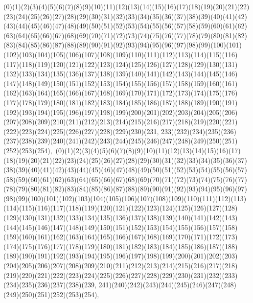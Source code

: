 \documentclass[12pt]{article}
\begin{document}
{(0)(1)(2)(3)(4)(5)(6)(7)(8)(9)(10)(11)(12)(13)(14)(15)(16)(17)(18)(19)(20)(21)(22)(23)(24)(25)(26)(27)(28)(29)(30)(31)(32)(33)(34)(35)(36)(37)(38)(39)(40)(41)(42)(43)(44)(45)(46)(47)(48)(49)(50)(51)(52)(53)(54)(55)(56)(57)(58)(59)(60)(61)(62)(63)(64)(65)(66)(67)(68)(69)(70)(71)(72)(73)(74)(75)(76)(77)(78)(79)(80)(81)(82)(83)(84)(85)(86)(87)(88)(89)(90)(91)(92)(93)(94)(95)(96)(97)(98)(99)(100)(101)(102)(103)(104)(105)(106)(107)(108)(109)(110)(111)(112)(113)(114)(115)(116)(117)(118)(119)(120)(121)(122)(123)(124)(125)(126)(127)(128)(129)(130)(131)(132)(133)(134)(135)(136)(137)(138)(139)(140)(141)(142)(143)(144)(145)(146)(147)(148)(149)(150)(151)(152)(153)(154)(155)(156)(157)(158)(159)(160)(161)(162)(163)(164)(165)(166)(167)(168)(169)(170)(171)(172)(173)(174)(175)(176)(177)(178)(179)(180)(181)(182)(183)(184)(185)(186)(187)(188)(189)(190)(191)(192)(193)(194)(195)(196)(197)(198)(199)(200)(201)(202)(203)(204)(205)(206)(207)(208)(209)(210)(211)(212)(213)(214)(215)(216)(217)(218)(219)(220)(221)(222)(223)(224)(225)(226)(227)(228)(229)(230)(231, 233)(232)(234)(235)(236)(237)(238)(239)(240)(241)(242)(243)(244)(245)(246)(247)(248)(249)(250)(251)(252)(253)(254)$
, 
$
(0)(1)(2)(3)(4)(5)(6)(7)(8)(9)(10)(11)(12)(13)(14)(15)(16)(17)(18)(19)(20)(21)(22)(23)(24)(25)(26)(27)(28)(29)(30)(31)(32)(33)(34)(35)(36)(37)(38)(39)(40)(41)(42)(43)(44)(45)(46)(47)(48)(49)(50)(51)(52)(53)(54)(55)(56)(57)(58)(59)(60)(61)(62)(63)(64)(65)(66)(67)(68)(69)(70)(71)(72)(73)(74)(75)(76)(77)(78)(79)(80)(81)(82)(83)(84)(85)(86)(87)(88)(89)(90)(91)(92)(93)(94)(95)(96)(97)(98)(99)(100)(101)(102)(103)(104)(105)(106)(107)(108)(109)(110)(111)(112)(113)(114)(115)(116)(117)(118)(119)(120)(121)(122)(123)(124)(125)(126)(127)(128)(129)(130)(131)(132)(133)(134)(135)(136)(137)(138)(139)(140)(141)(142)(143)(144)(145)(146)(147)(148)(149)(150)(151)(152)(153)(154)(155)(156)(157)(158)(159)(160)(161)(162)(163)(164)(165)(166)(167)(168)(169)(170)(171)(172)(173)(174)(175)(176)(177)(178)(179)(180)(181)(182)(183)(184)(185)(186)(187)(188)(189)(190)(191)(192)(193)(194)(195)(196)(197)(198)(199)(200)(201)(202)(203)(204)(205)(206)(207)(208)(209)(210)(211)(212)(213)(214)(215)(216)(217)(218)(219)(220)(221)(222)(223)(224)(225)(226)(227)(228)(229)(230)(231)(232)(233)(234)(235)(236)(237)(238)(239, 241)(240)(242)(243)(244)(245)(246)(247)(248)(249)(250)(251)(252)(253)(254)$
, 
$
}
\end{document}
